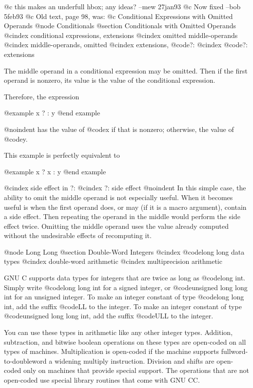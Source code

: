{@c this makes an underfull hbox; any ideas?  --mew 27jan93
@c Now fixed --bob 5feb93
@c Old text, page 98, was:
@c Conditional Expressions with Omitted Operands
@node Conditionals
@section Conditionals with Omitted Operands
@cindex conditional expressions, extensions
@cindex omitted middle-operands
@cindex middle-operands, omitted
@cindex extensions, @code{?:}
@cindex @code{?:} extensions

The middle operand in a conditional expression may be omitted.  Then
if the first operand is nonzero, its value is the value of the conditional
expression.

Therefore, the expression

@example
x ? : y
@end example

@noindent
has the value of @code{x} if that is nonzero; otherwise, the value of
@code{y}.

This example is perfectly equivalent to

@example
x ? x : y
@end example

@cindex side effect in ?:
@cindex ?: side effect
@noindent
In this simple case, the ability to omit the middle operand is not
especially useful.  When it becomes useful is when the first operand does,
or may (if it is a macro argument), contain a side effect.  Then repeating
the operand in the middle would perform the side effect twice.  Omitting
the middle operand uses the value already computed without the undesirable
effects of recomputing it.

@node Long Long
@section Double-Word Integers
@cindex @code{long long} data types
@cindex double-word arithmetic
@cindex multiprecision arithmetic

GNU C supports data types for integers that are twice as long as
@code{long int}.  Simply write @code{long long int} for a signed
integer, or @code{unsigned long long int} for an unsigned integer.
To make an integer constant of type @code{long long int}, add the suffix
@code{LL} to the integer.  To make an integer constant of type
@code{unsigned long long int}, add the suffix @code{ULL} to the integer.

You can use these types in arithmetic like any other integer types.
Addition, subtraction, and bitwise boolean operations on these types
are open-coded on all types of machines.  Multiplication is open-coded
if the machine supports fullword-to-doubleword a widening multiply
instruction.  Division and shifts are open-coded only on machines that
provide special support.  The operations that are not open-coded use
special library routines that come with GNU CC.

}
